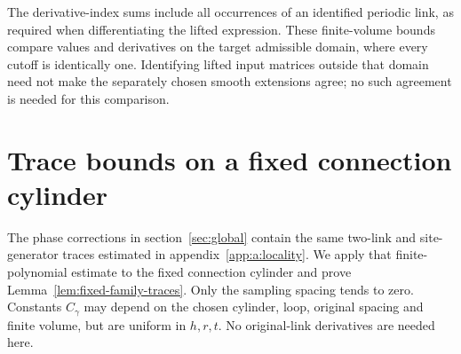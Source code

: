 \documentclass[11pt,a4paper]{article}
\theoremstyle{remark}
\begin{document}
The derivative-index sums include all occurrences of an identified
periodic link, as required when differentiating the lifted expression.
These finite-volume bounds compare values and derivatives on the target
admissible domain, where every cutoff is identically one. Identifying
lifted input matrices outside that domain need not make the separately
chosen smooth extensions agree; no such agreement is needed for this
comparison.

\section{Trace bounds on a fixed connection cylinder}
\label{app:d:cylinder-traces}

The phase corrections in section~\ref{sec:global} contain the same
two-link and site-generator traces estimated in
appendix~\ref{app:a:locality}. We apply that finite-polynomial estimate
to the fixed connection cylinder and prove
Lemma~\ref{lem:fixed-family-traces}. Only the sampling spacing tends to
zero. Constants $C_\gamma$ may depend on the chosen cylinder, loop,
original spacing and finite volume, but are uniform in $h,r,t$.
No original-link derivatives are needed here.
\end{document}
